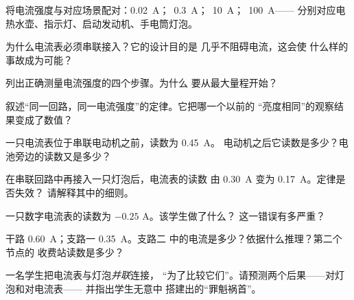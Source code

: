 \begin{exercise}[$\star$]\label{exo:g8:intensity-ammeter:2}
将电流强度与对应场景配对：\qty{0.02}{A}；\
\qty{0.3}{A}；\ \qty{10}{A}；\ \qty{100}{A}——
分别对应电热水壶、指示灯、启动发动机、手电筒灯泡。
\end{exercise}

\begin{exercise}[$\star$]\label{exo:g8:intensity-ammeter:3}
为什么电流表必须串联接入？它的设计目的是
几乎不阻碍电流，这会使
什么样的事故成为可能？
\end{exercise}

\begin{exercise}[$\star$]\label{exo:g8:intensity-ammeter:4}
列出正确测量电流强度的四个步骤。为什么
要从最大量程开始？
\end{exercise}

\begin{exercise}[$\star$]\label{exo:g8:intensity-ammeter:5}
叙述“同一回路，同一电流强度”的定律。它把哪一个以前的
“亮度相同”的观察结果变成了数值？
\end{exercise}

\begin{exercise}[$\star$]\label{exo:g8:intensity-ammeter:6}
一只电流表位于串联电动机之前，读数为 \qty{0.45}{A}。
电动机之后它读数是多少？电池旁边的读数又是多少？
\end{exercise}

\begin{exercise}[$\star$]\label{exo:g8:intensity-ammeter:7}
在串联回路中再接入一只灯泡后，电流表的读数
由 \qty{0.30}{A} 变为 \qty{0.17}{A}。定律是否失效？
请解释其中的细则。
\end{exercise}

\begin{exercise}[$\star$]\label{exo:g8:intensity-ammeter:8}
一只数字电流表的读数为 $-0.25$ \unit{A}。该学生做了什么？
这一错误有多严重？
\end{exercise}

\begin{exercise}[$\star\star$]\label{exo:g8:intensity-ammeter:9}
干路 \qty{0.60}{A}；支路一 \qty{0.35}{A}。支路二
中的电流是多少？依据什么推理？第二个节点的
收费站读数是多少？
\end{exercise}

\begin{exercise}[$\star\star$]\label{exo:g8:intensity-ammeter:10}
一名学生把电流表与灯泡\emph{并联}连接，
“为了比较它们”。请预测两个后果——对灯泡和对电流表——
并指出学生无意中
搭建出的“罪魁祸首”。
\end{exercise}

